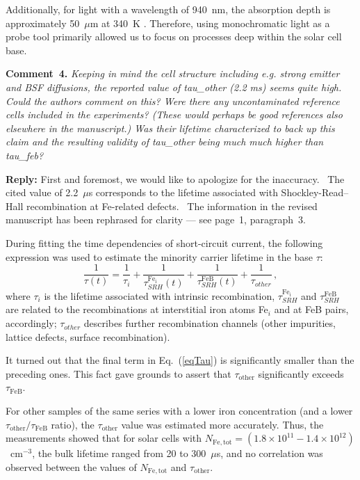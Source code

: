 \documentclass{WileyMSP-template}
\begin{document}
Additionally, for light with a wavelength of 940~nm, the absorption depth is approximately 50~$\mu$m at 340~K \cite{Green2022}.
Therefore, using monochromatic light as a probe tool primarily allowed us to focus on processes deep within the solar cell base.


\vspace{1cm}
\noindent
\textcolor[rgb]{0.00,0.50,1.00}{\textbf{Comment~4.}}
\emph{Keeping in mind the cell structure including e.g. strong emitter and BSF diffusions,
the reported value of tau\_other (2.2 ms) seems quite high.
Could the authors comment on this?
Were there any uncontaminated reference cells included in the experiments?
(These would perhaps be good references also elsewhere in the manuscript.)
Was their lifetime characterized to back up this claim and the resulting validity of tau\_other being much much higher than tau\_feb?
}


\noindent
\textcolor[rgb]{0.51,0.00,0.00}{\textbf{Reply:}}
First and foremost, we would like to apologize for the inaccuracy. 
The cited value of 2.2~$\mu$s corresponds to the lifetime associated with Shockley-Read–Hall recombination at Fe-related defects. 
The information in the revised manuscript has been rephrased for clarity --- see page~1, paragraph~3.

During fitting the time dependencies of short-circuit current,
the following expression was used to estimate the minority carrier lifetime in the base $\tau$:
\begin{equation}
\label{eqTau}
\frac{1}{\tau(t)}=\frac{1}{\tau_i}+\frac{1}{\tau_{SRH}^{\mathrm{Fe_i}}(t)}
+\frac{1}{\tau_{SRH}^\mathrm{FeB}(t)}+\frac{1}{\tau_{other}}\,,
\end{equation}
where
$\tau_i$ is the lifetime associated with intrinsic recombination,
$\tau_{SRH}^{\mathrm{Fe_i}}$ and $\tau_{SRH}^\mathrm{FeB}$ are related to the recombinations at interstitial iron atoms Fe$_i$ and at FeB pairs, accordingly;
$\tau_{other}$ describes further recombination channels
(other impurities, lattice defects, surface recombination).

It turned out that the final term in Eq.~(\ref{eqTau}) is significantly smaller than the preceding ones.
This fact gave grounds to assert that $\tau_\mathrm{other}$ significantly exceeds $\tau_\mathrm{FeB}$.

For other samples of the same series with a lower iron concentration (and a lower $\tau_\mathrm{other}/\tau_\mathrm{FeB}$ ratio),
the $\tau_\mathrm{other}$  value was estimated more accurately.
Thus, the measurements showed that for solar cells with
$N_\mathrm{Fe,tot}=(1.8\times10^{11}-1.4\times10^{12})$~cm$^{-3}$,
the bulk lifetime ranged from 20 to 300~$\mu$s,
and no correlation was observed between the values of $N_\mathrm{Fe,tot}$ and $\tau_\mathrm{other}$.
\end{document}
